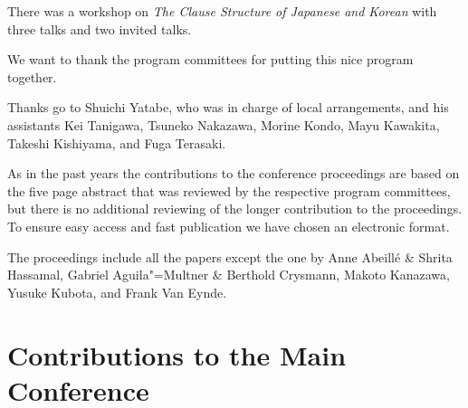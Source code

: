 \documentclass[11pt,a4paper,fleqn]{article}
\begin{document}
There was a workshop on \emph{The Clause Structure of Japanese and Korean} with three talks and two
invited talks.

We want to thank the program committees for putting this nice program together.

Thanks go to Shuichi Yatabe, who was in charge of local arrangements, and his assistants Kei Tanigawa,
Tsuneko Nakazawa,
Morine Kondo,
Mayu Kawakita,
Takeshi Kishiyama, and
Fuga Terasaki.
 

As in the past years the contributions to the conference proceedings are based on the five page abstract
that was reviewed by the respective program committees, but there is no additional reviewing of the
longer contribution to the proceedings.
To ensure easy access and fast publication we have chosen an electronic format.

The proceedings include all the papers except the one by Anne Abeillé \& Shrita Hassamal, Gabriel Aguila"=Multner \&
Berthold Crysmann, Makoto Kanazawa, Yusuke Kubota, and Frank Van Eynde. 




\newpage
\part{Contributions to the Main Conference}
\thispagestyle{empty}
\newpage
        \setcounter{page}{6}
\thispagestyle{empty}
\end{document}
